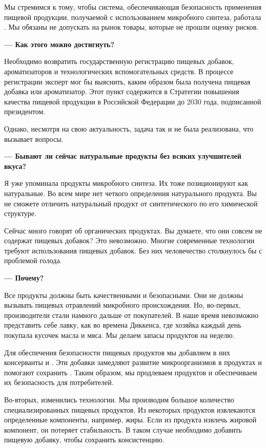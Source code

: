 Мы стремимся к тому, чтобы система, обеспечивающая безопасность применения
пищевой продукции, получаемой с использованием микробного синтеза, работала
.
Мы обязаны не допускать на рынок товары, которые не прошли оценку рисков.

\textbf{--- Как этого можно достигнуть?}

Необходимо возвратить государственную регистрацию пищевых добавок,
ароматизаторов и технологических вспомогательных средств.
В процессе регистрации эксперт мог бы выяснить,
каким образом была получена пищевая добавка или ароматизатор.
Этот пункт содержится в Стратегии повышения качества пищевой продукции
в Российской Федерации до 2030 года, подписанной президентом.

Однако, несмотря на свою актуальность, задача так и не
была реализована, что вызывает вопросы.

\textbf{--- Бывают ли сейчас натуральные продукты без всяких улучшителей вкуса? }


Я уже упоминала продукты микробного синтеза.
Их тоже позиционируют как натуральные.
Во всем мире нет четкого определения натурального продукта.
Вы не сможете отличить натуральный продукт от синтетического
по его химической структуре.

Сейчас много говорят об органических продуктах.
Вы думаете, что они совсем не содержат пищевых добавок?
Это невозможно. Многие современные технологии требуют использования
пищевых добавок. Без них человечество столкнулось бы с проблемой голода.

\textbf{--- Почему?}

Все продукты должны быть качественными и безопасными.
Они не должны вызывать пищевых отравлений микробного происхождения.
Но, во-первых, производители стали намного дальше от покупателей.
В наше время невозможно представить себе лавку, как во времена Диккенса,
где хозяйка каждый день покупала кусочек масла и мяса.
Мы делаем запасы продуктов на неделю.

Для обеспечения безопасности пищевых продуктов мы добавляем в них
консерванты и .
Эти добавки замедляют развитие микроорганизмов в продуктах и помогают
сохранить .
Таким образом, мы продлеваем 
продуктов и обеспечиваем их безопасность для потребителей.

Во-вторых, изменились технологии.
Мы производим большое количество специализированных пищевых продуктов.
Из некоторых продуктов извлекаются определенные компоненты, например, жиры.
Если из продукта извлечь жировой компонент, он потеряет стабильность.
В таком случае необходимо добавить пищевую добавку, чтобы сохранить консистенцию.

